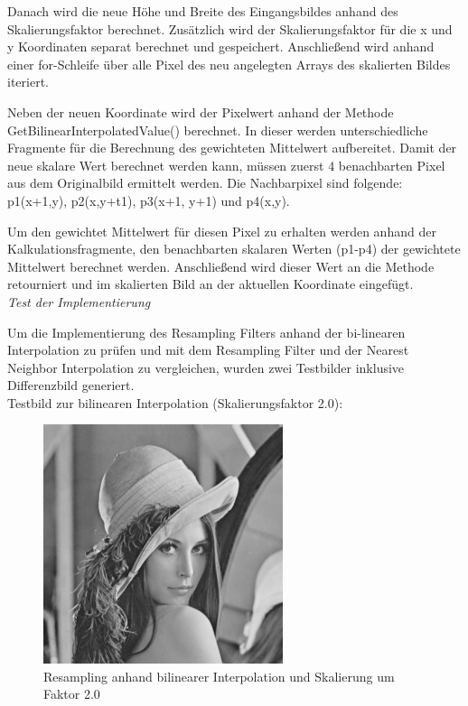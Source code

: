 \documentclass[12pt,german]{article}
\begin{document}
Danach wird die neue Höhe und Breite des Eingangsbildes anhand des Skalierungsfaktor berechnet. Zusätzlich wird der Skalierungsfaktor für die x und y Koordinaten separat berechnet und gespeichert. Anschließend wird anhand einer for-Schleife über alle Pixel des neu angelegten Arrays des skalierten Bildes iteriert. 

Neben der neuen Koordinate wird der Pixelwert anhand der Methode GetBilinearInterpolatedValue() berechnet. In dieser werden unterschiedliche Fragmente für die Berechnung des gewichteten Mittelwert aufbereitet. Damit der neue skalare Wert berechnet werden kann, müssen zuerst 4 benachbarten Pixel aus dem Originalbild ermittelt werden. Die Nachbarpixel sind folgende: p1(x+1,y), p2(x,y+t1), p3(x+1, y+1) und p4(x,y). 


Um den gewichtet Mittelwert für diesen Pixel zu erhalten werden anhand der Kalkulationsfragmente, den benachbarten skalaren Werten (p1-p4) der gewichtete Mittelwert berechnet werden. Anschließend wird dieser Wert an die Methode retourniert und im skalierten Bild an der aktuellen Koordinate eingefügt.\\

\textit{Test der Implementierung}

Um die Implementierung des Resampling Filters anhand der bi-linearen Interpolation zu prüfen und mit dem Resampling Filter und der Nearest Neighbor Interpolation zu vergleichen, wurden zwei Testbilder inklusive Differenzbild generiert.\\

Testbild zur bilinearen Interpolation (Skalierungsfaktor 2.0):

\begin{figure}[H]
	\centering
	\includegraphics[width=7cm]{images/bilineare-interpolation-final/bip-scaled-2.jpg}
	\caption{Resampling anhand bilinearer Interpolation und Skalierung um Faktor 2.0}
	\label{fig:resultResamplingBilinearInterpolation-2.0}
\end{figure}
\end{document}

